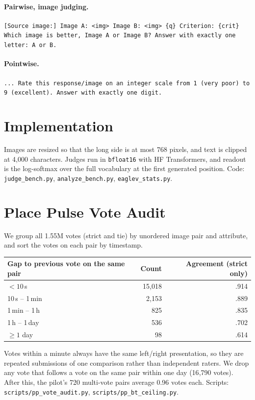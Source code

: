 \paragraph{Pairwise, image judging.}
\texttt{[Source image:] Image A: <img> Image B: <img> \{q\} Criterion: \{crit\} Which image is better, Image A or Image B? Answer with exactly one letter: A or B.}

\paragraph{Pointwise.}
\texttt{... Rate this response/image on an integer scale from 1 (very poor) to 9 (excellent). Answer with exactly one digit.}

\section{Implementation}
Images are resized so that the long side is at most 768 pixels, and text is clipped at 4{,}000 characters. Judges run in \texttt{bfloat16} with HF Transformers, and readout is the log-softmax over the full vocabulary at the first generated position. Code: \texttt{judge\_bench.py}, \texttt{analyze\_bench.py}, \texttt{eaglev\_stats.py}.

\section{Place Pulse Vote Audit}\label{app:ppaudit}
We group all 1.55M votes (strict and tie) by unordered image pair and attribute, and sort the votes on each pair by timestamp.

\begin{center}\small
\begin{tabular}{lrr}
\toprule
Gap to previous vote on the same pair & Count & Agreement (strict only)\\
\midrule
$<10$\,s & 15{,}018 & .914\\
10\,s -- 1\,min & 2{,}153 & .889\\
1\,min -- 1\,h & 825 & .835\\
1\,h -- 1\,day & 536 & .702\\
$\ge1$ day & 98 & .614\\
\bottomrule
\end{tabular}
\end{center}

Votes within a minute always have the same left/right presentation, so they are repeated submissions of one comparison rather than independent raters. We drop any vote that follows a vote on the same pair within one day (16{,}790 votes). After this, the pilot's 720 multi-vote pairs average 0.96 votes each. Scripts: \texttt{scripts/pp\_vote\_audit.py}, \texttt{scripts/pp\_bt\_ceiling.py}.
